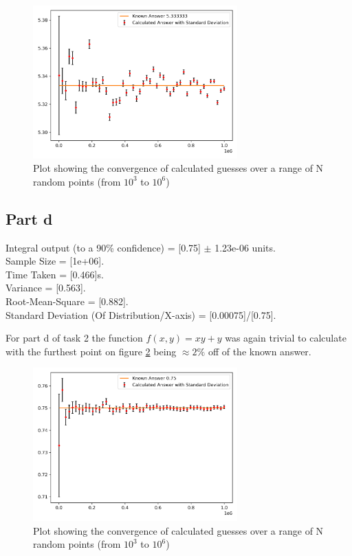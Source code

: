 \documentclass[12pt, A4]{article}
\begin{document}
\begin{figure}[H]
  \begin{center}
    \includegraphics[width=0.7\textwidth]{task_2_c.png}
  \end{center}
  \caption{Plot showing the convergence of calculated guesses over a range of N random points (from $10^3$ to $10^6$)}
  \label{fig:task_2_c}
\end{figure}



\subsection{Part d} %
\label{sub:Part d}


Integral output (to a 90\% confidence) = [0.75] $\pm$  1.23e-06 units.
\\
Sample Size = [1e+06].
\\
Time Taken = [0.466]s.
\\
Variance = [0.563].
\\
Root-Mean-Square = [0.882].
\\
Standard Deviation (Of Distribution/X-axis) = [0.00075]/[0.75].

\vspace{1em}

For part d of task 2 the function $f(x,y)=xy+y$ was again trivial to calculate 
with the furthest point on figure \ref{fig:task_2_d} being $\approx 2\%$ off of the known 
answer. 

\begin{figure}[H]
  \begin{center}
    \includegraphics[width=0.7\textwidth]{task_2_d.png}
  \end{center}
  \caption{Plot showing the convergence of calculated guesses over a range of N random points (from $10^3$ to $10^6$)}
  \label{fig:task_2_d}
\end{figure}
\end{document}
